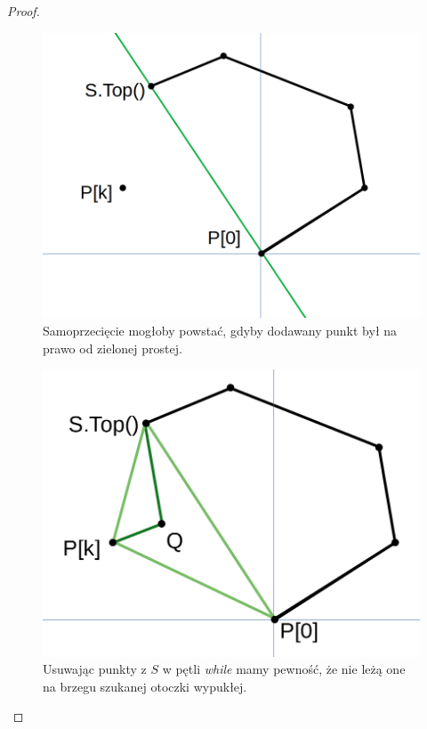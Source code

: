 \begin{theorem}
\begin{proof}
\begin{enumerate}
\begin{itemize}
\begin{enumerate}
					\begin{minipage}{0.47\linewidth}
						\begin{figure}[H]
							\centering
							\includegraphics[width=\textwidth]{data/graham1.png}
							\caption{\small Samoprzecięcie mogłoby powstać, gdyby dodawany punkt był na prawo od zielonej prostej.}
							\label{fig:graham:samoprzeciecie}
						\end{figure}
					\end{minipage}
					\hfill
					\begin{minipage}{0.47\linewidth}
						\begin{figure}[H]
							\centering
							\includegraphics[width=\textwidth]{data/graham2.png}
							\caption{\small Usuwając punkty z $S$ w pętli \textit{while} mamy pewność, że nie leżą one na brzegu szukanej otoczki wypukłej.}
							\label{fig:graham:usuwanie}
						\end{figure}
					\end{minipage}				


\end{enumerate}
\end{itemize}
\end{enumerate}
\end{proof}
\end{theorem}
